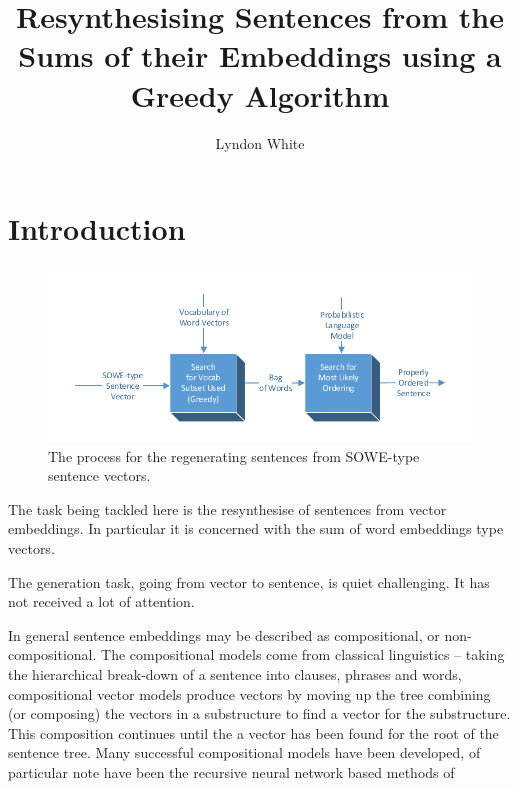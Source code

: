 \documentclass[]{scrartcl}
\title{Resynthesising Sentences from the Sums of their Embeddings using a Greedy Algorithm}
\author{Lyndon White}
\numberwithin{equation}{section}
\numberwithin{figure}{section}
\theoremstyle{plain}
\theoremstyle{definition}
\begin{document}
\maketitle

\begin{abstract}

\end{abstract}

\section{Introduction}


\begin{figure}
	\centering 
	\includegraphics{block_diagram}
	\caption{The process for the regenerating sentences from SOWE-type sentence vectors.}
	\label{block_diagram}
\end{figure}
The task being tackled here is the resynthesise of sentences from vector embeddings.
In particular it is concerned with the sum of word embeddings type vectors.


The generation task, going from vector to sentence, is quiet challenging.
It has not received a lot of attention.



In general sentence embeddings may be described as compositional, or non-compositional.
The compositional models come from classical linguistics -- taking the hierarchical  break-down of a sentence into clauses, phrases and words, compositional vector models produce vectors by moving up the tree combining (or composing) the vectors in a substructure to find a vector for the substructure. This composition continues until the a vector has been found for the root of the sentence tree. Many successful compositional models have been developed, of particular note have been the recursive neural network based methods of  \cite{socher2010PhraseEmbedding}%
\end{document}

